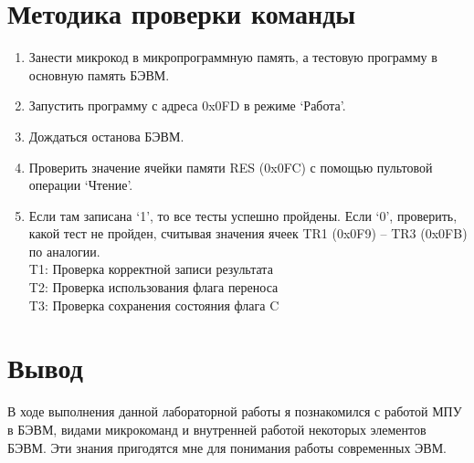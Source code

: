 \section{Методика проверки команды}
\begin{enumerate}
\item Занести микрокод в микропрограммную память, а тестовую программу в основную память БЭВМ.
\item Запустить программу с адреса 0x0FD в режиме `Работа'.
\item Дождаться останова БЭВМ.
\item Проверить значение ячейки памяти RES (0x0FC) с помощью пультовой операции `Чтение'.
\item Если там записана `1', то все тесты успешно пройдены. Если `0', проверить, какой тест не пройден, считывая значения ячеек TR1 (0x0F9) -- TR3 (0x0FB) по аналогии.\\

T1: Проверка корректной записи результата\\
T2: Проверка использования флага переноса\\
T3: Проверка сохранения состояния флага C
\end{enumerate}

\section{Вывод}
В ходе выполнения данной лабораторной работы я познакомился с работой МПУ в БЭВМ, видами микрокоманд и внутренней работой некоторых элементов БЭВМ. Эти знания пригодятся мне для понимания работы современных ЭВМ.
